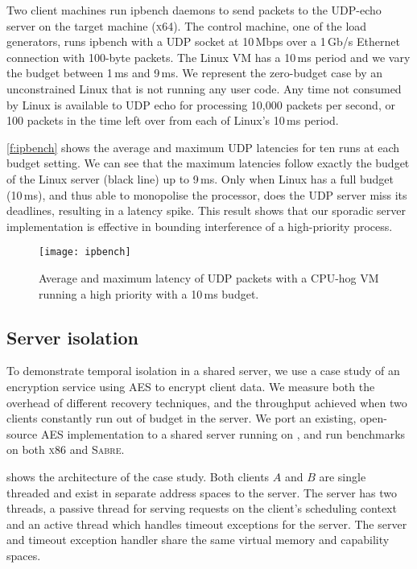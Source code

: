 Two client machines run ipbench daemons to send packets to the UDP-echo server on the target machine
(\textsc{x64}). The control machine, one of the load generators, runs ipbench with a \gls{UDP} socket at 10\,Mbps over a 1\,Gb/s Ethernet connection with 100-byte packets. The Linux VM has a 10\,ms period and we vary the
budget between 1\,ms and 9\,ms.
We represent the zero-budget case by an unconstrained Linux that is not running any user code.
Any time not consumed by Linux is available to UDP echo for processing
10,000 packets per second, or 100 packets in the time left over from
each of Linux's 10\,ms period.

\autoref{f:ipbench} shows the average and maximum \gls{UDP} latencies for
ten runs at each budget setting. We can see that the maximum latencies
follow exactly the budget of the Linux server (black line) up to 9\,ms. Only
when Linux has a full budget (10\,ms), and thus able to monopolise the
processor, does the UDP server miss its deadlines, resulting in a
latency spike.  This result shows that our sporadic server implementation is effective in bounding
interference of a high-priority process.

\begin{figure}[h]
  \centering
  \texttt{[image: ipbench]}
  \caption[Results of ipbench isolation benchmark.]{Average and maximum latency of UDP packets with
  a CPU-hog VM running a high priority with a 10\,ms budget.}
  \label{f:ipbench}
\end{figure}

\subsection{Server isolation} 
\label{s:server-isolation}

To demonstrate temporal isolation in a shared server, we use a case study of an encryption service
using \gls{AES} to encrypt client data. We measure both the overhead of different
recovery techniques, and the throughput achieved when two clients constantly run out of budget in the server. 
We port an existing, open-source \gls{AES} implementation to a shared server running on \selfour, and run
benchmarks on both \textsc{x86} and \textsc{Sabre}.

 shows the architecture of the case study. Both clients $A$ and $B$ are single
 threaded and exist in separate address spaces to the server. The server has two threads, a passive
 thread for serving requests on the client's scheduling context and an active thread which handles
 timeout exceptions for the server. The server and timeout exception handler share the same virtual
 memory and capability spaces.

